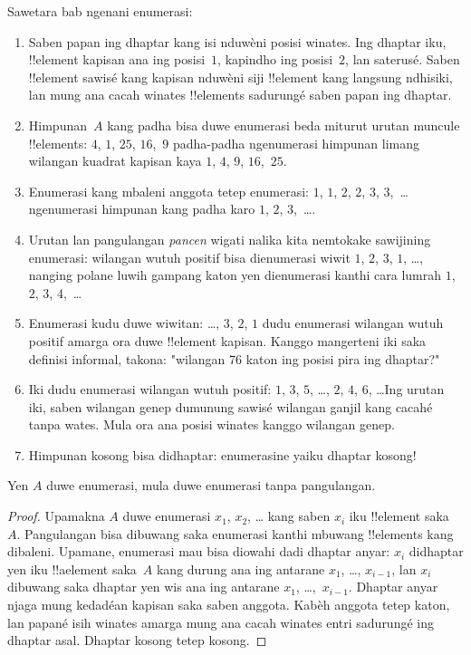\documentclass[../../../include/open-logic-section]{subfiles}
\begin{document}
\begin{explain}
Sawetara bab ngenani enumerasi:
\begin{enumerate}
\item Saben papan ing dhaptar kang isi nduwèni posisi winates. Ing dhaptar iku, !!{element} kapisan
  ana ing posisi~$1$, kapindho ing posisi~$2$, lan saterusé.
  Saben !!{element} sawisé kang kapisan nduwèni siji !!{element}
  kang langsung ndhisiki, lan mung ana cacah winates !!{element}s
  sadurungé saben papan ing dhaptar.
\item Himpunan~$A$ kang padha bisa duwe enumerasi beda
  miturut urutan muncule !!{element}s: $4$, $1$,
  $25$, $16$,~$9$ padha-padha ngenumerasi himpunan limang
  wilangan kuadrat kapisan kaya $1$, $4$, $9$, $16$,~$25$.
\item Enumerasi kang mbaleni anggota tetep enumerasi: $1$, $1$, $2$,
  $2$, $3$, $3$,~\dots{} ngenumerasi himpunan kang padha karo $1$, $2$,
  $3$,~\dots{}.
\item Urutan lan pangulangan \emph{pancen} wigati nalika kita nemtokake
  sawijining enumerasi: wilangan wutuh positif bisa dienumerasi wiwit
  $1$, $2$, $3$, $1$, \dots{}, nanging polane luwih gampang katon
  yen dienumerasi kanthi cara lumrah $1$, $2$, $3$, $4$,~\dots
\item Enumerasi kudu duwe wiwitan: \dots, $3$, $2$, $1$ dudu
  enumerasi wilangan wutuh positif amarga ora duwe !!{element}
  kapisan. Kanggo mangerteni iki saka definisi informal,
  takona: "wilangan 76 katon ing posisi pira ing dhaptar?"
\item Iki dudu enumerasi wilangan wutuh positif:
  $1$, $3$, $5$, \dots, $2$, $4$, $6$, \dots\@ Ing urutan iki,
  saben wilangan genep dumunung sawisé wilangan ganjil kang cacahé tanpa wates.
  Mula ora ana posisi winates kanggo wilangan genep.
\item Himpunan kosong bisa didhaptar: enumerasine yaiku dhaptar kosong!{}
\end{enumerate}
\end{explain}

\begin{prop}
  Yen $A$ duwe enumerasi, mula duwe enumerasi tanpa
  pangulangan.
\end{prop}

\begin{proof}
  Upamakna $A$ duwe enumerasi $x_1$, $x_2$, \dots{} kang saben
  $x_i$ iku !!{element} saka~$A$. Pangulangan bisa dibuwang saka
  enumerasi kanthi mbuwang !!{element}s kang dibaleni. Upamane,
  enumerasi mau bisa diowahi dadi dhaptar anyar: $x_i$ didhaptar yen
  iku !!a{element} saka~$A$ kang durung ana ing antarane $x_1$, \dots,
  $x_{i-1}$, lan $x_i$ dibuwang saka dhaptar yen wis ana ing antarane
  $x_1$, \dots,~$x_{i-1}$. Dhaptar anyar njaga mung kedadéan kapisan saka saben anggota.
  Kabèh anggota tetep katon, lan papané isih winates amarga mung ana
  cacah winates entri sadurungé ing dhaptar asal. Dhaptar kosong tetep kosong.
\end{proof}
\end{document}
